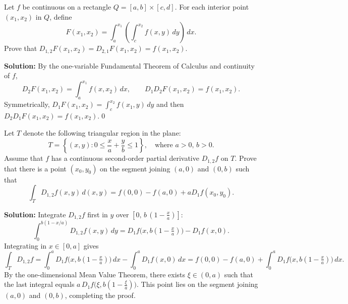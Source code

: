 \begin{problembox}
Let \( f \) be continuous on a rectangle \( Q = [a, b] \times [c, d] \). For each interior point \( (x_1, x_2) \) in \( Q \), define
\[F(x_1, x_2) = \int_a^{x_1} \left( \int_c^{x_2} f(x, y) \, dy \right) \, dx.\]
Prove that \( D_{1,2} F(x_1, x_2) = D_{2,1} F(x_1, x_2) = f(x_1, x_2) \).
\end{problembox}

\bigskip\noindent\textbf{Solution:}
By the one-variable Fundamental Theorem of Calculus and continuity of $f$,
\[ D_2 F(x_1,x_2) = \int_a^{x_1} f(x,x_2)\,dx, \qquad D_1 D_2 F(x_1,x_2) = f(x_1,x_2). \]
Symmetrically, $D_1 F(x_1,x_2)=\int_c^{x_2} f(x_1,y)\,dy$ and then $D_2 D_1 F(x_1,x_2)=f(x_1,x_2)$.\qed


\begin{problembox}
Let \( T \) denote the following triangular region in the plane:
\[T = \left\{ (x, y) : 0 \leq \frac{x}{a} + \frac{y}{b} \leq 1 \right\}, \quad \text{where } a > 0, \, b > 0.\]
Assume that \( f \) has a continuous second-order partial derivative \( D_{1,2} f \) on \( T \). Prove that there is a point \( (x_0, y_0) \) on the segment joining \( (a, 0) \) and \( (0, b) \) such that
\[\int_T D_{1,2} f(x, y) \, d(x, y) = f(0, 0) - f(a, 0) + aD_1 f(x_0, y_0).\]
\end{problembox}

\bigskip\noindent\textbf{Solution:}
Integrate $D_{1,2}f$ first in $y$ over $[0,\,b\,(1-\tfrac{x}{a})]$:
\[ \int_0^{b(1-x/a)} D_{1,2}f(x,y)\,dy = D_1 f\big(x, b(1-\tfrac{x}{a})\big) - D_1 f(x,0). \]
Integrating in $x\in[0,a]$ gives
\[ \int_T D_{1,2}f = \int_0^a D_1 f\big(x, b(1-\tfrac{x}{a})\big)\,dx - \int_0^a D_1 f(x,0)\,dx = f(0,0)-f(a,0) + \int_0^a D_1 f\big(x, b(1-\tfrac{x}{a})\big)\,dx. \]
By the one-dimensional Mean Value Theorem, there exists $\xi\in(0,a)$ such that the last integral equals $a\,D_1 f\big(\xi, b(1-\tfrac{\xi}{a})\big)$. This point lies on the segment joining $(a,0)$ and $(0,b)$, completing the proof.